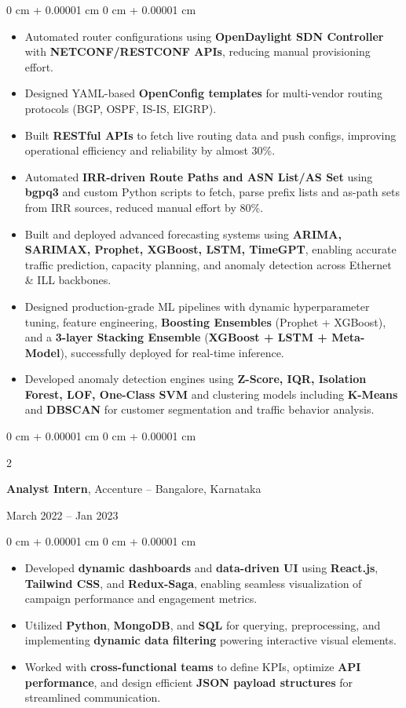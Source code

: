 \documentclass[10pt, letterpaper]{article}
\newenvironment{highlights}{
    \begin{itemize}[
        topsep=0.10 cm,
        parsep=0.10 cm,
        partopsep=0pt,
        itemsep=0pt,
        leftmargin=0 cm + 10pt
    ]
}{
    \end{itemize}
} %
\newenvironment{onecolentry}{
    \begin{adjustwidth}{
        0 cm + 0.00001 cm
    }{
        0 cm + 0.00001 cm
    }
}{
    \end{adjustwidth}
} %
\newenvironment{twocolentry}[2][]{
    \onecolentry
    \def\secondColumn{#2}
    \setcolumnwidth{\fill, 4.5 cm}
    \begin{paracol}{2}
}{
    \switchcolumn \raggedleft \secondColumn
    \end{paracol}
    \endonecolentry
} %
\begin{document}
\vspace{0.10 cm}
\begin{onecolentry}
    \begin{highlights}
        \item Automated router configurations using \textbf{OpenDaylight SDN Controller} with \textbf{NETCONF/RESTCONF APIs}, reducing manual provisioning effort.
        \item Designed YAML-based \textbf{OpenConfig templates} for multi-vendor routing protocols (BGP, OSPF, IS-IS, EIGRP).
        \item Built \textbf{RESTful APIs} to fetch live routing data and push configs, improving operational efficiency and reliability by almost 30\%.
        \item Automated \textbf{IRR-driven Route Paths and ASN List/AS Set} using \textbf{bgpq3} and custom Python scripts to fetch, parse prefix lists and as-path sets from IRR sources, reduced manual effort by 80\%.
        \item Built and deployed advanced forecasting systems using \textbf{ARIMA, SARIMAX, Prophet, XGBoost, LSTM, TimeGPT}, enabling accurate traffic prediction, capacity planning, and anomaly detection across Ethernet \& ILL backbones.
        \item Designed production-grade ML pipelines with dynamic hyperparameter tuning, feature engineering, \textbf{Boosting Ensembles} (Prophet + XGBoost), and a \textbf{3-layer Stacking Ensemble} (\textbf{XGBoost + LSTM + Meta-Model}), successfully deployed for real-time inference.
        \item Developed anomaly detection engines using \textbf{Z-Score, IQR, Isolation Forest, LOF, One-Class SVM} and clustering models including \textbf{K-Means} and \textbf{DBSCAN} for customer segmentation and traffic behavior analysis.
    \end{highlights}
\end{onecolentry}
\vspace{0.2 cm}
\begin{twocolentry}{
    March 2022 – Jan 2023
}
    \textbf{Analyst Intern}, Accenture -- Bangalore, Karnataka
\end{twocolentry}
\vspace{0.10 cm}
\begin{onecolentry}
    \begin{highlights}
        \item Developed \textbf{dynamic dashboards} and \textbf{data-driven UI} using \textbf{React.js}, \textbf{Tailwind CSS}, and \textbf{Redux-Saga}, enabling seamless visualization of campaign performance and engagement metrics.
        \item Utilized \textbf{Python}, \textbf{MongoDB}, and \textbf{SQL} for querying, preprocessing, and implementing \textbf{dynamic data filtering} powering interactive visual elements.
        \item Worked with \textbf{cross-functional teams} to define KPIs, optimize \textbf{API performance}, and design efficient \textbf{JSON payload structures} for streamlined communication.
    \end{highlights}
\end{onecolentry}
\end{document}
